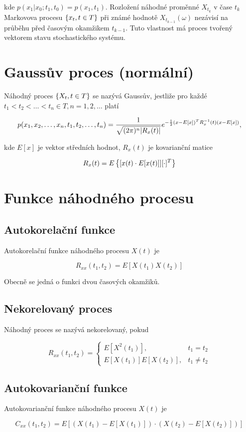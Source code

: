kde $p(x_1|x_0;t_1,t_0)=p(x_1,t_1)$. Rozložení náhodné proměnné $X_{t_k}$ v čase $t_k$ Markovova procesu $\brs{x_t,t\in T}$ při známé hodnotě $X_{t_{k-1}}(\omega)$ nezávisí na průběhu před časovým okamžikem $t_{k-1}$. Tuto vlastnost má proces tvořený vektorem stavu stochastického systému.

\section{Gaussův proces (normální)}
Náhodný proces $\brs{X_t,t\in T}$ se nazývá Gaussův, jestliže pro každé $t_1<t_2<\ldots<t_n\in T, n=1,2,\ldots$ platí

\[ p(\vecrow[x],\vecrow[t])=\frac{1}{\sqrt{(2\pi)^n |R_x(t)|}} e^{-\frac{1}{2}(x-E[x])^T R_x^{-1}(t)(x-E[x])}, \]

kde $E[x]$ je vektor středních hodnot, $R_x(t)$ je kovarianční matice

\[ R_x(t)=E\brs{[x(t)\cdot E[x(t)]][\cdot]^T} \]

\section{Funkce náhodného procesu}
\subsection{Autokorelační funkce}
Autokorelační funkce náhodného procesu $X(t)$ je

\[ R_{xx}(t_1,t_2)=E[X(t_1)X(t_2)] \]

Obecně se jedná o funkci dvou časových okamžiků.

\subsection{Nekorelovaný proces}
Náhodný proces se nazývá nekorelovaný, pokud

\[
R_{xx}(t_1,t_2) =
\begin{cases}
	E[X^2(t_1)], & t_1=t_2\\
	E[X(t_1)]E[X(t_2)],&t_1\neq t_2
\end{cases}
\]

\subsection{Autokovarianční funkce}
Autokovarianční funkce náhodného procesu $X(t)$ je

\[ C_{xx}(t_1,t_2) = E[(X(t_1)-E[X(t_1)])\cdot (X(t_2)-E[X(t_2)])] \]

